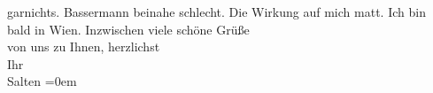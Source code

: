 \begin{ledgroupsized}[t]{13cm}
               garnichts. Bassermann beinahe schlecht. Die
               Wirkung auf mich matt. Ich bin bald in Wien.\pend
           \pstart
           Inzwischen viele schöne Grüße {\\[\baselineskip]}von uns zu Ihnen, herzlichst {\\[\baselineskip]}Ihr {\\[\baselineskip]}\spacefill\mbox{Salten}\pend
           \leftskip=0em{}
         
         \endnumbering{}\end{ledgroupsized}  \newcommand{\dateiname}{L03513}\newcommand{\titel}{Felix Salten an Arthur Schnitzler, 15. 10. 1907}\newcommand{\editorInnen}{Martin Anton Müller und Laura Untner}
      